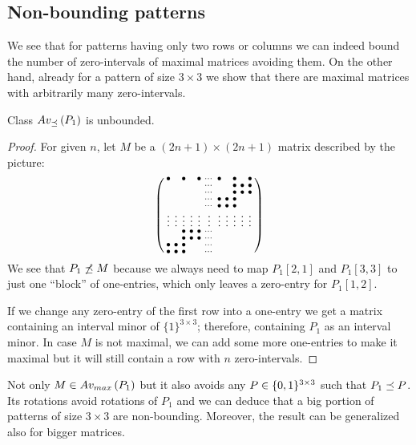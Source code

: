 \subsection{Non-bounding patterns}
We see that for patterns having only two rows or columns we can indeed bound the number of zero-intervals of maximal matrices avoiding them. On the other hand, already for a pattern of size $3\times3$ we show that there are maximal matrices with arbitrarily many zero-intervals.

\begin{lemma}
\label{lemma:manyints}
Class $Av_{\preceq}\left(P_1\right)$ is unbounded.
\end{lemma}
\begin{proof} For given $n$, let $M$ be a $(2n+1)\times(2n+1)$ matrix described by the picture:
$$\left(\begin{smallmatrix}	\bullet& &\bullet& &\bullet&\cdots&\bullet& &\bullet& &\bullet\\
		 & & & & &\cdots& & &\bullet&\bullet&\bullet\\
		 & & & & &\cdots& & &\bullet&\bullet&\bullet\\
		 & & & & &\cdots&\bullet&\bullet&\bullet& & \\
		 & & & & &\cdots&\bullet&\bullet&\bullet& & \\
		\vdots&\vdots&\vdots&\vdots&\vdots&\vdots&\vdots&\vdots&\vdots&\vdots&\vdots\\
		 & &\bullet&\bullet&\bullet&\cdots& & & & & \\
		 & &\bullet&\bullet&\bullet&\cdots& & & & & \\
		\bullet&\bullet&\bullet& & &\cdots& & & & & \\
		\bullet&\bullet&\bullet& & &\cdots& & & & & \\
		 \end{smallmatrix}\right)$$
We see that $P_1\not\preceq M$ because we always need to map $P_1[2,1]$ and $P_1[3,3]$ to just one ``block'' of one-entries, which only leaves a zero-entry for $P_1[1,2]$.

If we change any zero-entry of the first row into a one-entry we get a matrix containing an interval minor of $\{1\}^{3\times3}$; therefore, containing $P_1$ as an interval minor. In case $M$ is not maximal, we can add some more one-entries to make it maximal but it will still contain a row with $n$ zero-intervals.
\end{proof}

Not only $M\in Av_{max}\left(P_1\right)$ but it also avoids any $P\in\{0,1\}^{3\times3}$ such that $P_1\preceq P$. Its rotations avoid rotations of $P_1$ and we can deduce that a big portion of patterns of size $3\times3$ are non-bounding. Moreover, the result can be generalized also for bigger matrices.

